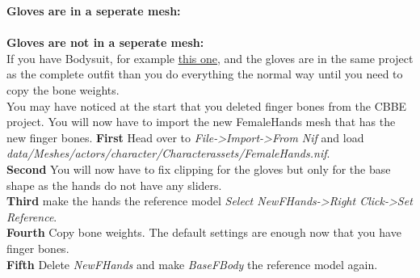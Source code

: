 \textbf{Gloves are in a seperate mesh:}\\
\\
\textbf{Gloves are not in a seperate mesh:}\\
If you have Bodysuit, for example \href{https://www.nexusmods.com/fallout4/mods/40500}{this one}, and the gloves are in the 
same project as the complete outfit than you do everything the normal way until you need to copy the bone weights.\\
You may have noticed at the start that you deleted finger bones from the CBBE project. You will now have to import the 
new FemaleHands mesh that has the new finger bones. 
\textbf{First} Head over to \textit{File->Import->From Nif} and load \textit{data/Meshes/actors/character/Characterassets/FemaleHands.nif}.\\
\textbf{Second} You will now have to fix clipping for the gloves but only for the base shape as the hands do not have any sliders.\\
\textbf{Third} make the hands the reference model \textit{Select NewFHands->Right Click->Set Reference}.\\
\textbf{Fourth} Copy bone weights. The default settings are enough now that you have finger bones.\\
\textbf{Fifth} Delete \textit{NewFHands} and make \textit{BaseFBody} the reference model again.